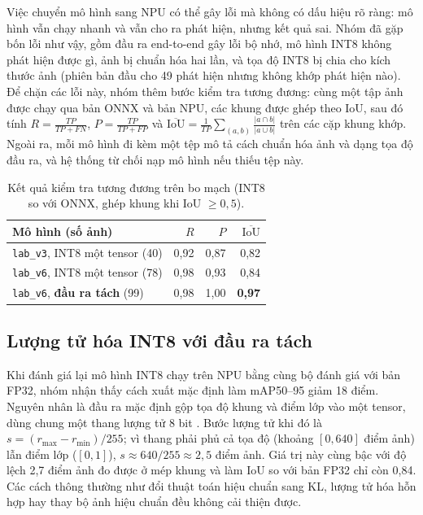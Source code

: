 \documentclass[11pt,a4paper,twocolumn]{article}
\begin{document}
Việc chuyển mô hình sang NPU có thể gây lỗi mà không có dấu hiệu rõ ràng: mô hình vẫn chạy nhanh và vẫn cho ra phát hiện, nhưng kết quả sai. Nhóm đã gặp bốn lỗi như vậy, gồm
đầu ra end-to-end gây lỗi bộ nhớ, mô hình INT8 không phát hiện được gì, ảnh bị chuẩn hóa hai lần, và tọa độ INT8 bị chia cho kích thước ảnh (phiên bản đầu cho 49 phát hiện nhưng
không khớp phát hiện nào). Để chặn các lỗi này, nhóm thêm bước kiểm tra tương đương: cùng một tập ảnh được chạy qua bản ONNX và bản NPU, các khung được ghép theo IoU, sau đó tính
$R=\tfrac{TP}{TP+FN}$, $P=\tfrac{TP}{TP+FP}$ và $\overline{\mathrm{IoU}}=\tfrac{1}{TP}\sum_{(a,b)}\tfrac{|a\cap b|}{|a\cup b|}$ trên các cặp khung khớp. Ngoài ra, mỗi mô hình đi kèm
một tệp mô tả cách chuẩn hóa ảnh và dạng tọa độ đầu ra, và hệ thống từ chối nạp mô hình nếu thiếu tệp này.

\begin{table}[t]
\centering
\caption{Kết quả kiểm tra tương đương trên bo mạch (INT8 so với ONNX, ghép khung khi IoU $\ge0{,}5$).}
\label{tab:parity}
\footnotesize
\begin{tabular}{@{}lrrr@{}}
\toprule
Mô hình (số ảnh) & $R$ & $P$ & $\overline{\mathrm{IoU}}$ \\
\midrule
\texttt{lab\_v3}, INT8 một tensor (40) & 0,92 & 0,87 & 0,82 \\
\texttt{lab\_v6}, INT8 một tensor (78) & 0,98 & 0,93 & 0,84 \\
\texttt{lab\_v6}, \textbf{đầu ra tách} (99) & 0,98 & 1,00 & \textbf{0,97} \\
\bottomrule
\end{tabular}
\end{table}

\subsection{Lượng tử hóa INT8 với đầu ra tách}
\label{sec:int8}

Khi đánh giá lại mô hình INT8 chạy trên NPU bằng cùng bộ đánh giá với bản FP32, nhóm nhận thấy cách xuất mặc định làm mAP50--95 giảm 18 điểm. Nguyên nhân là đầu ra mặc định gộp
tọa độ khung và điểm lớp vào một tensor, dùng chung một thang lượng tử 8 bit \cite{jacob}. Bước lượng tử khi đó là $s=(r_{\max}-r_{\min})/255$; vì thang phải phủ cả tọa độ (khoảng
$[0,640]$ điểm ảnh) lẫn điểm lớp ($[0,1]$), $s\approx640/255\approx2{,}5$ điểm ảnh. Giá trị này cùng bậc với độ lệch 2,7 điểm ảnh đo được ở mép khung và làm IoU so với bản FP32 chỉ còn
0,84. Các cách thông thường như đổi thuật toán hiệu chuẩn sang KL, lượng tử hóa hỗn hợp hay thay bộ ảnh hiệu chuẩn đều không cải thiện được.
\end{document}
